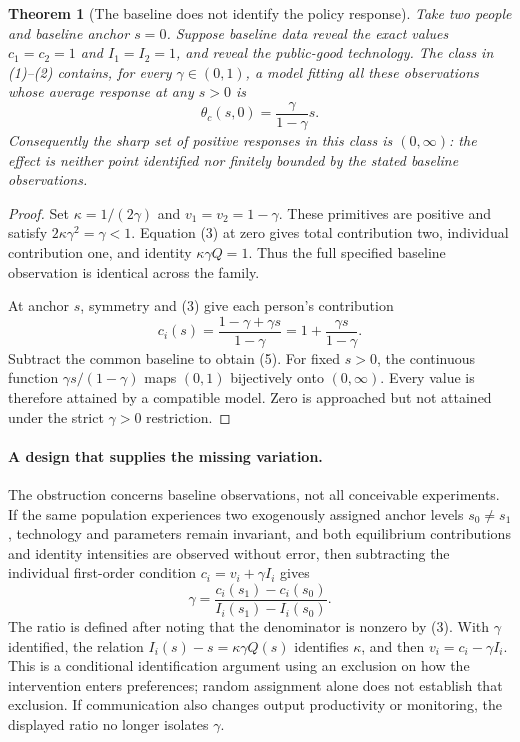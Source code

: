 \documentclass[11pt]{article}
\newtheorem{theorem}{Theorem}
\theoremstyle{definition}
\begin{document}
\begin{theorem}[The baseline does not identify the policy response]
Take two people and baseline anchor $s=0$. Suppose baseline data reveal the exact values $c_1=c_2=1$ and $I_1=I_2=1$, and reveal the public-good technology. The class in (1)--(2) contains, for every $\gamma\in(0,1)$, a model fitting all these observations whose average response at any $s>0$ is
\[
 \theta_c(s,0)=\frac{\gamma}{1-\gamma}s.
 \tag{5}
\]
Consequently the sharp set of positive responses in this class is $(0,\infty)$: the effect is neither point identified nor finitely bounded by the stated baseline observations.
\end{theorem}
\begin{proof}
Set $\kappa=1/(2\gamma)$ and $v_1=v_2=1-\gamma$. These primitives are positive and satisfy $2\kappa\gamma^2=\gamma<1$. Equation (3) at zero gives total contribution two, individual contribution one, and identity $\kappa\gamma Q=1$. Thus the full specified baseline observation is identical across the family.

At anchor $s$, symmetry and (3) give each person's contribution
\[
 c_i(s)=\frac{1-\gamma+\gamma s}{1-\gamma}
       =1+\frac{\gamma s}{1-\gamma}.
\]
Subtract the common baseline to obtain (5). For fixed $s>0$, the continuous function $\gamma s/(1-\gamma)$ maps $(0,1)$ bijectively onto $(0,\infty)$. Every value is therefore attained by a compatible model. Zero is approached but not attained under the strict $\gamma>0$ restriction.
\end{proof}

\paragraph{A design that supplies the missing variation.}
The obstruction concerns baseline observations, not all conceivable experiments. If the same population experiences two exogenously assigned anchor levels $s_0\ne s_1$, technology and parameters remain invariant, and both equilibrium contributions and identity intensities are observed without error, then subtracting the individual first-order condition $c_i=v_i+\gamma I_i$ gives
\[
 \gamma=\frac{c_i(s_1)-c_i(s_0)}{I_i(s_1)-I_i(s_0)}.
\]
The ratio is defined after noting that the denominator is nonzero by (3). With $\gamma$ identified, the relation $I_i(s)-s=\kappa\gamma Q(s)$ identifies $\kappa$, and then $v_i=c_i-\gamma I_i$. This is a conditional identification argument using an exclusion on how the intervention enters preferences; random assignment alone does not establish that exclusion. If communication also changes output productivity or monitoring, the displayed ratio no longer isolates $\gamma$.
\end{document}
